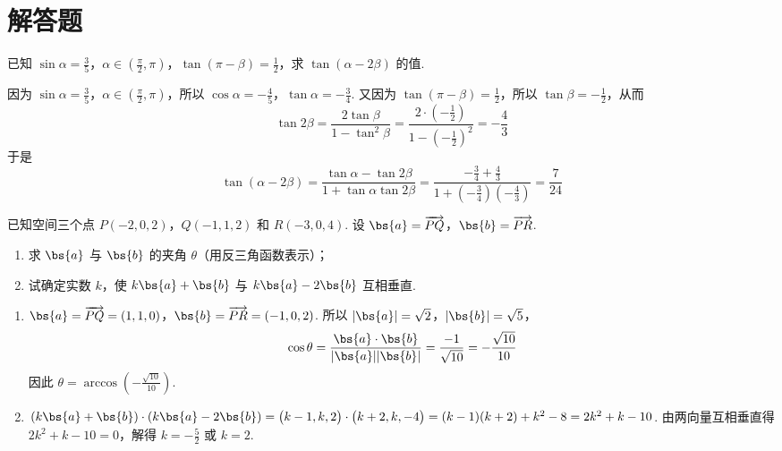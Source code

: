 \section{解答题}

\begin{problem}
已知 \(\sin\alpha=\frac{3}{5}\)，\(\alpha\in\left(\frac{\pi}{2},\pi\right)\)，\(\tan(\pi-\beta)=\frac{1}{2}\)，求 \(\tan(\alpha-2\beta) \) 的值.
\end{problem}

\begin{solution}
因为 \(\sin \alpha = \frac{3}{5}\)，\(\alpha \in \left(\frac{\pi}{2}, \pi\right)\)，所以 \(\cos \alpha = -\frac{4}{5}\)，\(\tan \alpha = -\frac{3}{4}\).
又因为 \(\tan(\pi - \beta) = \frac{1}{2}\)，所以 \(\tan \beta = -\frac{1}{2}\)，从而
\[
\tan 2\beta=\frac{2\tan \beta}{1 - \tan^2 \beta}=\frac{2 \cdot \left(-\frac{1}{2}\right)}{1 - \left(-\frac{1}{2}\right)^2}=-\frac{4}{3}
\]
于是
\[
\tan(\alpha - 2\beta)=\frac{\tan \alpha - \tan 2\beta}{1 + \tan \alpha \tan 2\beta}=\frac{-\frac{3}{4} + \frac{4}{3}}{1 + \left(-\frac{3}{4}\right)\left(-\frac{4}{3}\right)}=\frac{7}{24}
\]
\end{solution}

\begin{problem}
已知空间三个点 \(P(-2,0,2)\)，\(Q(-1,1,2)\) 和 \(R(-3,0,4)\). 设 \(\bs{a} = \overrightarrow{PQ}\)，\(\bs{b} = \overrightarrow{PR}\).

\begin{enumerate}
\item 求 \(\bs{a} \) 与 \(\bs{b} \) 的夹角 \(\theta \)（用反三角函数表示）；
\item 试确定实数 \(k\)，使 \(k \bs{a} + \bs{b}\) 与 \(k \bs{a} - 2\bs{b}\) 互相垂直.
\end{enumerate}
\end{problem}

\begin{solution}
\begin{enumerate}
\item \(\bs{a} = \overrightarrow{PQ} = (1,1,0)\)，\(\bs{b} = \overrightarrow{PR} = (-1,0,2)\). 所以 \(\left|\bs{a}\right|=\sqrt{2}\)，\(\left|\bs{b}\right|=\sqrt{5}\)，
\[
\cos \theta=\frac{\bs{a}\cdot \bs{b}}{|\bs{a}||\bs{b}|}=\frac{-1}{\sqrt{10}}=-\frac{\sqrt{10}}{10}
\]
因此 \(\theta = \arccos\left(-\frac{\sqrt{10}}{10}\right)\).

\item \((k\bs{a}+\bs{b})\cdot(k\bs{a}-2\bs{b}) = \bigl(k-1,k,2\bigr)\cdot \bigl(k+2,k,-4\bigr) = (k-1)(k+2)+k^2-8 = 2k^2+k-10\). 由两向量互相垂直得 \(2k^2+k-10=0\)，解得 \(k=-\frac{5}{2}\) 或 \(k=2\).
\end{enumerate}
\end{solution}

